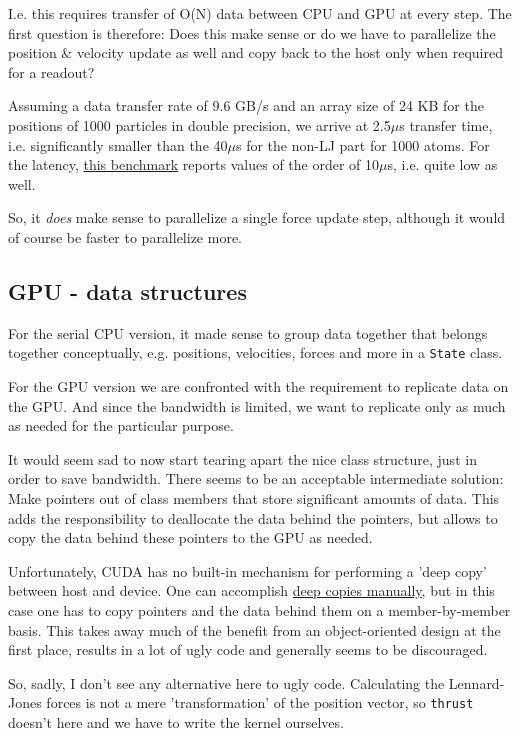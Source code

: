 \documentclass{scrartcl}
\begin{document}
I.e. this requires transfer of O(N) data between CPU and GPU at every step.
The first question is therefore: Does this make sense or 
do we have to parallelize
the position \& velocity update as well and copy back to the host
only when required for a readout?

Assuming a data transfer rate of 9.6 GB/s and an array size of
24 KB for the positions of 1000 particles in double precision,
we arrive at 2.5$\mu$s transfer time, 
i.e. significantly smaller than the 40$\mu$s
for the non-LJ part for 1000 atoms.
For the latency, \href{http://www.princeton.edu/~dlustig/dlustig_HPCA13.pdf}{this benchmark}
reports values of the order of 10$\mu$s, i.e. quite low as well.

So, it \emph{does} make sense to parallelize a single force 
update step, although it would of course be faster
to parallelize more.


\subsection{GPU - data structures}

For the serial CPU version, it made sense to group data together that
belongs together conceptually, e.g. positions, velocities, forces and more
in a \verb|State| class.

For the GPU version we are confronted with the requirement to replicate
data on the GPU. And since the bandwidth is limited, we want to replicate only
as much as needed for the particular purpose.

It would seem sad to now start tearing apart the nice class structure,
just in order to save bandwidth.
There seems to be an acceptable intermediate solution: 
Make pointers out of class members that store significant amounts of data.
This adds the responsibility to deallocate the data behind the pointers,
but allows to copy the data behind these pointers to the GPU as needed.

Unfortunately, CUDA has no built-in mechanism for performing a 'deep copy'
between host and device.
One can accomplish \href{http://stackoverflow.com/questions/15431365/cudamemcpy-segmentation-fault/15435592#15435592}{deep copies manually},
but in this case one has to copy pointers and the data behind them
on a member-by-member basis.
This takes away much of the benefit from an object-oriented
design at the first place, 
results in a lot of ugly code and generally seems to be discouraged.

So, sadly, I don't see any alternative here to ugly code.
Calculating the Lennard-Jones forces is not a mere 'transformation' of
the position vector, so \verb|thrust| doesn't here and we have to 
write the kernel ourselves.
\end{document}
